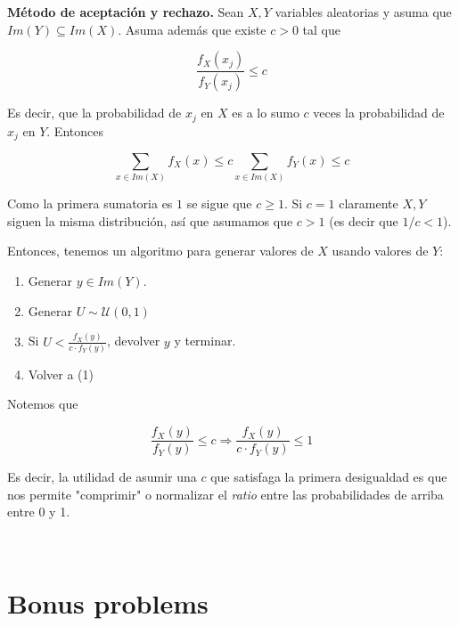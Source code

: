 \documentclass[a4paper, 12pt]{article}
\begin{document}
\pagebreak 


\begin{myframe}
\textbf{Método de aceptación y rechazo.} Sean $X, Y$ variables aleatorias y asuma que $Im(Y)
\subseteq Im(X)$. Asuma además que existe $c > 0$ tal que

\begin{equation*}
  \frac{ f_X(x_j) }{f_Y(x_j)} \leq c
\end{equation*}

Es decir, que la probabilidad de $x_j$ en $X$ es a lo sumo $c$ veces la
probabilidad de $x_j$ en $Y$. Entonces 

\begin{equation*}
  \sum_{x \in Im(X)} f_X(x) \leq c \sum_{x \in Im(X)} f_Y(x) \leq c
\end{equation*}

Como la primera sumatoria es $1$ se sigue que $c \geq 1$. Si $c = 1$ claramente
$X, Y$ siguen la misma distribución, así que asumamos que $c > 1$ (es decir que 
$1 / c < 1$).

Entonces, 
tenemos un algoritmo para generar valores de $X$ usando valores de $Y$:

\begin{enumerate}
  \item Generar $y \in Im(Y)$.
  \item Generar $U \sim \mathcal{U}(0, 1)$
  \item Si $U < \frac{f_X(y)}{c \cdot f_Y(y)}$, devolver $y$ y terminar.
  \item Volver a (1)
\end{enumerate}

Notemos que 

\begin{equation*}
  \frac{f_X(y)}{f_Y(y)} \leq c \Rightarrow  \frac{f_X(y)}{c \cdot f_Y(y)} \leq 1
\end{equation*}

Es decir, la utilidad de asumir una $c$ que satisfaga la primera desigualdad es
que nos permite "comprimir" o normalizar el \textit{ratio} entre las
probabilidades de arriba entre 0 y 1. 
\end{myframe}

~
\pagebreak 






\pagebreak 

\section{Bonus problems}
\end{document}
